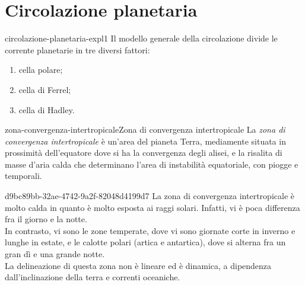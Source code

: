 \documentclass[preview]{standalone}
\begin{document}
\genpage

\section{Circolazione planetaria}


\begin{snippet}{circolazione-planetaria-expl1}
    Il modello generale della circolazione divide le corrente planetarie in tre diversi fattori:
    \begin{enumerate}
        \item cella polare;
        \item cella di Ferrel;
        \item cella di Hadley.
    \end{enumerate}
\end{snippet}




\begin{snippetdefinition}{zona-convergenza-intertropicale}{Zona di convergenza intertropicale}
    La \textit{zona di convergenza intertropicale} è un'area del pianeta Terra, mediamente situata in prossimità dell'equatore
    dove si ha la convergenza degli alisei, e la risalita di masse d'aria calda che determinano l'area di instabilità equatoriale, con piogge e temporali.
\end{snippetdefinition}

\begin{snippet}{d9bc89bb-32ae-4742-9a2f-82048d4199d7}
    La zona di convergenza intertropicale è molto calda in quanto è molto esposta ai raggi solari.
    Infatti, vi è poca differenza fra il giorno e la notte.
    \\
    In contrasto, vi sono le zone temperate, dove vi sono giornate corte in inverno e lunghe
    in estate, e le calotte polari (artica e antartica), dove si alterna fra un gran dì e una grande notte.
    \\
    La delineazione di questa zona non è lineare ed è dinamica, a dipendenza dall'inclinazione della terra
    e correnti oceaniche.
\end{snippet}
\end{document}
